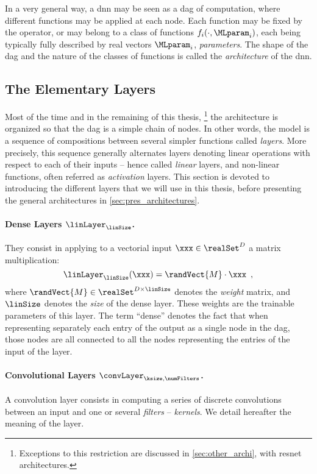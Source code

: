 In a very general way, a \gls{dnn} may be seen as a \gls{dag} of computation, where different functions may be applied at each node.
Each function may be fixed by the operator, or may belong to a class of functions \(f_i(\cdot, \MLparam_i)\), each being typically fully described by real vectors \(\MLparam_i\), \aka{} \emph{parameters}.
The shape of the \gls{dag} and the nature of the classes of functions is called the \emph{architecture} of the \gls{dnn}.


\subsection{The Elementary Layers}
\label{sec:pres_layers}
Most of the time and in the remaining of this thesis,%
\footnote{
	Exceptions to this restriction are discussed in \autoref{sec:other_archi}, \eg{} with \gls{resnet} architectures.
}
the architecture is organized so that the \gls{dag} is a simple chain of nodes.
In other words, the model is a sequence of compositions between several simpler functions called \emph{layers}.
More precisely, this sequence generally alternates layers denoting linear operations with respect to each of their inputs -- hence called \emph{linear} layers, and non-linear functions, often referred as \emph{activation} layers.
This section is devoted to introducing the different layers that we will use in this thesis, before presenting the general architectures in \autoref{sec:pres_architectures}.

\paragraph{Dense Layers \(\linLayer_\linSize\).}%
They consist in  applying to a vectorial input \(\xxx \in \realSet^D\) a matrix multiplication:
\begin{equation}
	\linLayer_\linSize(\xxx) = \randVect{M} \cdot \xxx \enspace ,
\end{equation}
where \(\randVect{M} \in \realSet^{D\times \linSize}\) denotes the \emph{weight} matrix, and \(\linSize\) denotes the \emph{size} of the dense layer.
These weights are the trainable parameters of this layer.
The term ``dense'' denotes the fact that when representing separately each entry of the output as a single node in the \gls{dag}, those nodes are all connected to all the nodes representing the entries of the input of the layer.

\paragraph{Convolutional Layers \(\convLayer_{\ksize, \numFilters}\).}
A convolution layer consists in computing a series of discrete convolutions between an input and one or several \emph{filters} -- \aka{} \emph{kernels}.
We detail hereafter the meaning of the layer.

